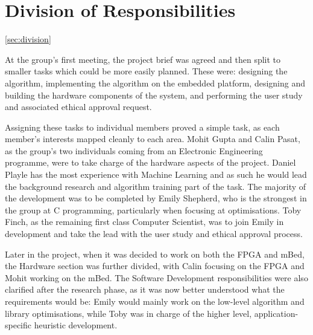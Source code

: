 \section{Division of Responsibilities} \ref{sec:division}

At the group's first meeting, the project brief was agreed and then split to smaller tasks which could be more easily planned. These were: designing the algorithm, implementing the algorithm on the embedded platform, designing and building the hardware components of the system, and performing the user study and associated ethical approval request.

Assigning these tasks to individual members proved a simple task, as each member's interests mapped cleanly to each area. Mohit Gupta and Calin Pasat, as the group's two individuals coming from an Electronic Engineering programme, were to take charge of the hardware aspects of the project. Daniel Playle has the most experience with Machine Learning and as such he would lead the background research and algorithm training part of the task. The majority of the development was to be completed by Emily Shepherd, who is the strongest in the group at C programming, particularly when focusing at optimisations. Toby Finch, as the remaining first class Computer Scientist, was to join Emily in development and take the lead with the user study and ethical approval process.

Later in the project, when it was decided to work on both the FPGA and mBed, the Hardware section was further divided, with Calin focusing on the FPGA and Mohit working on the mBed. The Software Development responsibilities were also clarified after the research phase, as it was now better understood what the requirements would be: Emily would mainly work on the low-level algorithm and library optimisations, while Toby was in charge of the higher level, application-specific heuristic development.